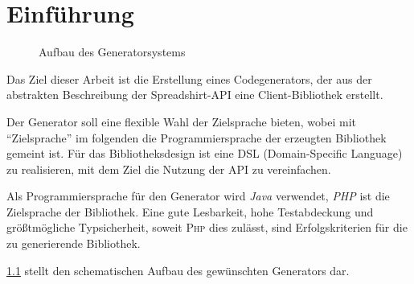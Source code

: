  \chapter{Einführung}
\label{chap:introduction}


\begin{figure}[b]
    \centering
    \resizebox{\textwidth}{!}{
        
    }
    \caption{Aufbau des Generatorsystems}
    \label{fig:generatorstructure}
\end{figure}        

Das Ziel dieser Arbeit ist die Erstellung eines Codegenerators, der aus der abstrakten Beschreibung der Spreadshirt-\gls{API} eine Client-Bibliothek erstellt.

Der Generator soll eine flexible Wahl der Zielsprache bieten, wobei mit \enquote{Zielsprache} im folgenden die Programmiersprache der erzeugten Bibliothek gemeint ist. 
Für das Bibliotheksdesign ist eine \gls{DSL} (Domain-Specific Language) zu realisieren, mit dem Ziel die Nutzung der \gls{API} zu vereinfachen. 

Als Programmiersprache für den Generator wird \emph{Java} verwendet, \emph{PHP} ist die Zielsprache der Bibliothek.
Eine gute Lesbarkeit, hohe Testabdeckung und größtmögliche Typsicherheit, soweit \textsc{Php} dies zulässt, sind Erfolgskriterien für die zu generierende Bibliothek.

\cref{fig:generatorstructure} stellt den schematischen Aufbau des gewünschten Generators dar.



